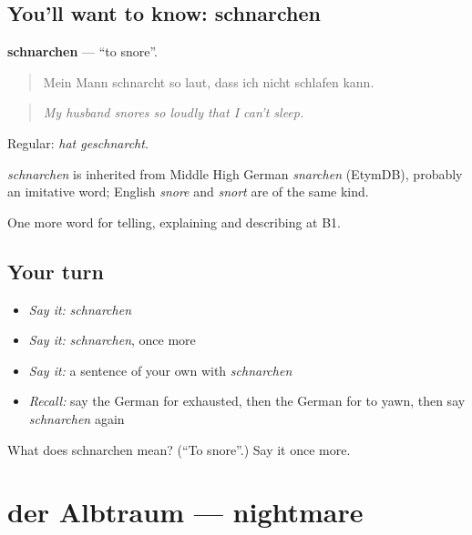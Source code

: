 \subsection*{You'll want to know: schnarchen}
\textbf{schnarchen} — \textquotedblleft{}to snore\textquotedblright{}.

\begin{quote}
Mein Mann schnarcht so laut, dass ich nicht schlafen kann.
\end{quote}

\begin{quote}
\emph{My husband snores so loudly that I can't sleep.}
\end{quote}

Regular: \emph{hat geschnarcht}.

\begin{cousinweb}
\emph{schnarchen} is inherited from Middle High German \emph{snarchen} (EtymDB), probably an imitative word; English \emph{snore} and \emph{snort} are of the same kind.
\end{cousinweb}

\begin{grammarlens}[title={What you've built}]
One more word for telling, explaining and describing at B1.
\end{grammarlens}

\subsection*{Your turn}
\begin{itemize}
\raggedright
  \item \emph{Say it:} \emph{schnarchen}
  \item \emph{Say it:} \emph{schnarchen}, once more
  \item \emph{Say it:} a sentence of your own with \emph{schnarchen}
  \item \emph{Recall:} say the German for exhausted, then the German for to yawn, then say \emph{schnarchen} again
\end{itemize}

\begin{tcolorbox}[breakable,colback=teal!4,colframe=teal!35!black,title={Before you move on}]
What does schnarchen mean? (\textquotedblleft{}To snore\textquotedblright{}.) Say it once more.
\end{tcolorbox}
\section[der Albtraum]{der Albtraum — nightmare}

